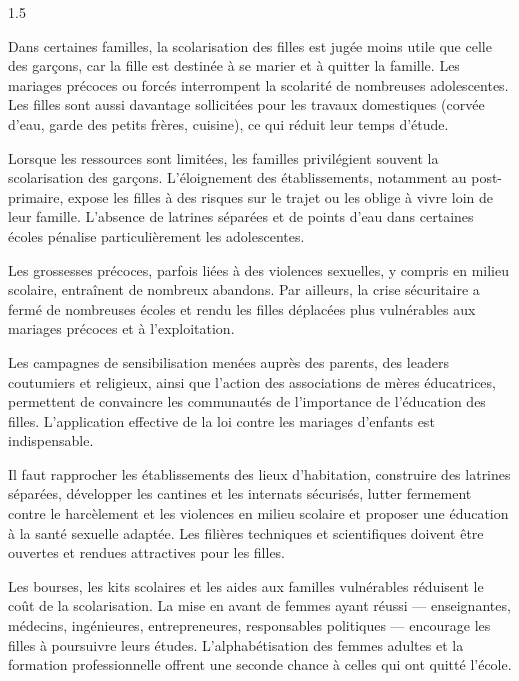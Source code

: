 \documentclass[12pt]{article}
\begin{document}
\begin{spacing}{1.5}

Dans certaines familles, la scolarisation des filles est jugée moins utile que celle des garçons, car la fille est destinée à se marier et à quitter la famille. Les mariages précoces ou forcés interrompent la scolarité de nombreuses adolescentes. Les filles sont aussi davantage sollicitées pour les travaux domestiques (corvée d'eau, garde des petits frères, cuisine), ce qui réduit leur temps d'étude.

Lorsque les ressources sont limitées, les familles privilégient souvent la scolarisation des garçons. L'éloignement des établissements, notamment au post-primaire, expose les filles à des risques sur le trajet ou les oblige à vivre loin de leur famille. L'absence de latrines séparées et de points d'eau dans certaines écoles pénalise particulièrement les adolescentes.

Les grossesses précoces, parfois liées à des violences sexuelles, y compris en milieu scolaire, entraînent de nombreux abandons. Par ailleurs, la crise sécuritaire a fermé de nombreuses écoles et rendu les filles déplacées plus vulnérables aux mariages précoces et à l'exploitation.



Les campagnes de sensibilisation menées auprès des parents, des leaders coutumiers et religieux, ainsi que l'action des associations de mères éducatrices, permettent de convaincre les communautés de l'importance de l'éducation des filles. L'application effective de la loi contre les mariages d'enfants est indispensable.

Il faut rapprocher les établissements des lieux d'habitation, construire des latrines séparées, développer les cantines et les internats sécurisés, lutter fermement contre le harcèlement et les violences en milieu scolaire et proposer une éducation à la santé sexuelle adaptée. Les filières techniques et scientifiques doivent être ouvertes et rendues attractives pour les filles.

Les bourses, les kits scolaires et les aides aux familles vulnérables réduisent le coût de la scolarisation. La mise en avant de femmes ayant réussi — enseignantes, médecins, ingénieures, entrepreneures, responsables politiques — encourage les filles à poursuivre leurs études. L'alphabétisation des femmes adultes et la formation professionnelle offrent une seconde chance à celles qui ont quitté l'école.


\end{spacing}
\end{document}
